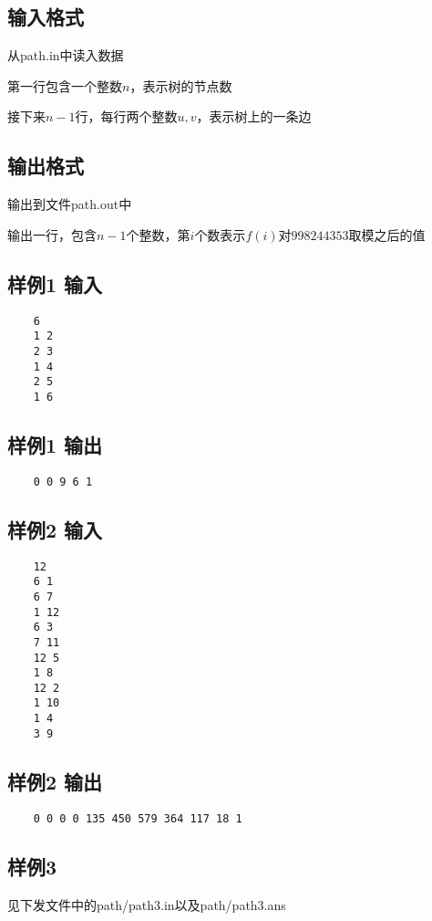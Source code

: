 \documentclass[12pt]{article}
\begin{document}
	\subsection{输入格式}
	从path.in中读入数据\par
	第一行包含一个整数$n$，表示树的节点数\par
	接下来$n - 1$行，每行两个整数$u, v$，表示树上的一条边\par
	\subsection{输出格式}
	输出到文件path.out中\par
	输出一行，包含$n - 1$个整数，第$i$个数表示$f(i)$对$998244353$取模之后的值
	\subsection{样例1 输入}
	\begin{lstlisting}
    6
    1 2
    2 3
    1 4
    2 5
    1 6		
	\end{lstlisting}
	\subsection{样例1 输出}
	\begin{lstlisting}
    0 0 9 6 1 	
	\end{lstlisting}
	\subsection{样例2 输入}
	\begin{lstlisting}
    12
    6 1
    6 7
    1 12
    6 3
    7 11
    12 5
    1 8
    12 2
    1 10
    1 4
    3 9	
	\end{lstlisting}
	\subsection{样例2 输出}
	\begin{lstlisting}
    0 0 0 0 135 450 579 364 117 18 1 	
	\end{lstlisting}
	\subsection{样例3}
	见下发文件中的path/path3.in以及path/path3.ans
\end{document}
